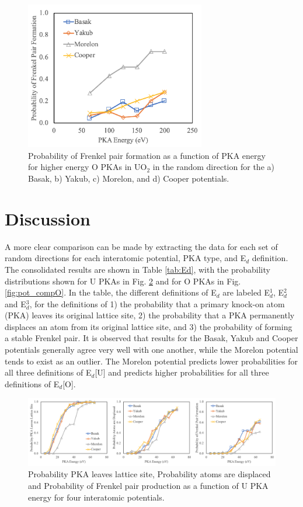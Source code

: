 \documentclass[review]{elsarticle}
\begin{document}
\begin{figure}[h]
 \centering
 \includegraphics[width=0.7\textwidth]{FP_OE.png}
 \caption{Probability of Frenkel pair formation as a function of PKA energy for higher energy O PKAs in UO$_2$ in the random direction for the a) Basak, b) Yakub, c) Morelon, and d) Cooper potentials.}
 \label{fig:fpoe}
\end{figure}

\FloatBarrier

\section{Discussion}

A more clear comparison can be made by extracting the data for each set of random directions for each interatomic potential, PKA type, and E$_d$ definition. The consolidated results are shown in Table \ref{tab:Ed}, with the probability distributions shown for U PKAs in Fig. \ref{fig:pot_compU} and for O PKAs in Fig. \ref{fig:pot_compO}. In the table, the different definitions of E$_d$ are labeled E$_d^1$, E$_d^2$ and E$_d^3$, for the definitions of 1) the probability that a primary knock-on atom (PKA) leaves its original lattice site, 2) the probability that a PKA permanently displaces an atom from its original lattice site, and 3) the probability of forming a stable Frenkel pair. It is observed that results for the Basak, Yakub and Cooper potentials generally agree very well with one another, while the Morelon potential tends to exist as an outlier. The Morelon potential predicts lower probabilities for all three definitions of E$_d$[U] and predicts higher probabilities for all three definitions  of E$_d$[O].

\begin{figure}[h]
 \centering
 \includegraphics[width=1.0\textwidth]{pot_compU.png}
 \caption{Probability PKA leaves lattice site, Probability atoms are displaced and Probability of Frenkel pair production as a function of U PKA energy for four interatomic potentials. }
 \label{fig:pot_compU}
\end{figure}
\end{document}
